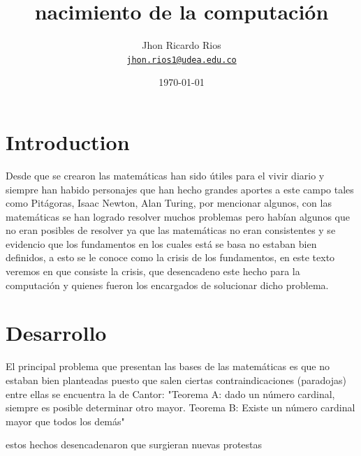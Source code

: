 \documentclass[11pt]{article}
\title{nacimiento de la computación}
\author{Jhon Ricardo Rios\\%
    \href{mailto:jhon.rios1@udea.edu.co}{\texttt{jhon.rios1@udea.edu.co}} %
    }
\date{\today}
\begin{document}
{
\maketitle

}


\section{Introduction}

\begin{center}
Desde que se crearon las matemáticas han sido útiles para el vivir diario y siempre han habido
personajes que han hecho grandes aportes a este campo tales como Pitágoras, Isaac Newton, Alan Turing, por mencionar algunos,
con las matemáticas se han logrado resolver muchos problemas pero habían algunos que no eran posibles de resolver ya que las matemáticas no eran consistentes y se evidencio que los fundamentos en los cuales está se basa no estaban bien definidos, a esto se le conoce como la crisis de los fundamentos, en este texto veremos en que consiste la crisis, que desencadeno este hecho para la computación y quienes fueron los encargados de solucionar dicho problema.
\end{center}

\section{Desarrollo}
\cite{ferreiros2004episodio}

\begin{center}
El principal problema que presentan las bases de las matemáticas es que no estaban bien planteadas puesto que salen ciertas contraindicaciones (paradojas) entre ellas se encuentra la de Cantor: 
"Teorema A: dado un número cardinal, siempre es posible determinar otro mayor.
Teorema B: Existe un número cardinal mayor que todos los demás"

estos hechos desencadenaron que surgieran nuevas protestas    
\end{center}
\citep{Chavas2015} %
\end{document}
